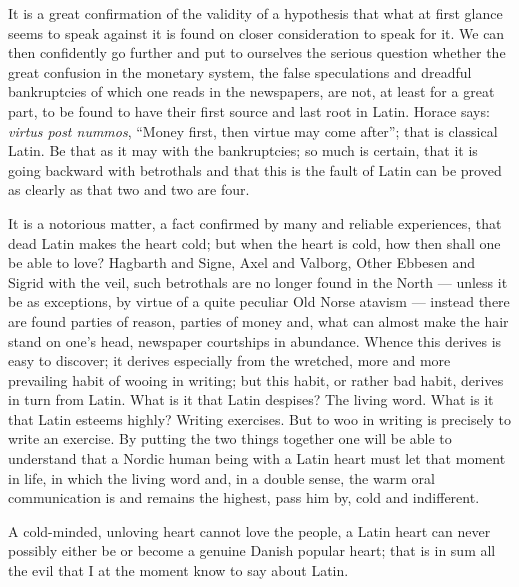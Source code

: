 \documentclass[12pt,a4paper,openany]{book}
\newcommand{\opage}[1]{\marginnote{\footnotesize\textit{[#1]}}}
\begin{document}
It is a great confirmation of the validity
of a hypothesis that what at first glance seems to
speak against it is found on closer consideration to
speak for it. We can then confidently go further and
put to ourselves the serious question whether the
great confusion in the monetary system, the false speculations
and dreadful bankruptcies of which one reads in
the newspapers, are not, at least for a great part, to be found
to have their first source and last root in
Latin. Horace says: \emph{virtus post nummos}, ``Money
first, then virtue may come after''; that is
classical Latin. Be that as it may with the bankruptcies;
so much is certain, that it is going backward with betrothals
\setcounter{footnote}{0}%
\opage{127}and that this is the fault of Latin can be proved as
clearly as that two and two are four.

It is a notorious matter, a fact confirmed by many and reliable
experiences, that dead
Latin makes the heart cold; but when the heart is cold,
how then shall one be able to love? Hagbarth and
Signe, Axel and Valborg, Other Ebbesen and Sigrid with
the veil, such betrothals are no longer found in the North ---
unless it be as exceptions, by virtue of a quite
peculiar Old Norse atavism --- instead there are found parties of reason,
parties of money and, what can almost
make the hair stand on one's head, newspaper courtships
in abundance. Whence this derives is easy to discover;
it derives especially from the wretched, more and more
prevailing habit of wooing in writing; but this
habit, or rather bad habit, derives in turn from Latin.
What is it that Latin despises? The living word.
What is it that Latin esteems highly? Writing exercises. But
to woo in writing is precisely to write an exercise. By putting the
two things together one will be able to understand that a Nordic
human being with a Latin heart must let that moment
in life, in which the living word and, in a double sense,
the warm oral communication is and remains the highest,
pass him by, cold and indifferent.

A cold-minded, unloving heart cannot love
the people, a Latin heart can never possibly either
be or become a genuine Danish popular heart; that is
in sum all the evil that I at the moment know
to say about Latin.
\end{document}
